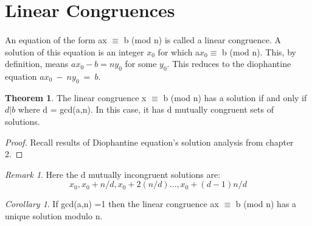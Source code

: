 \documentclass[15,a4paper]{report}
\theoremstyle{definition}
\newtheorem{theorem}{Theorem}[section]
\theoremstyle{remark}
\newtheorem*{remark}{Remark}
\newtheorem{corollary}{Corollary}[theorem]
\begin{document}
    \section{Linear Congruences}
        \paragraph{} An equation of the form ax $\equiv$ b (mod n) is called a linear congruence. A solution of this equation is an integer $x_0$ for which a$x_0 \equiv$ b (mod n). This, by definition, means $a x_0 - b = n y _0$ for some $y_0$. This reduces to the diophantine equation $ a x_0~ -~ n y_0 ~=~ b$.
        \begin{theorem}
            The linear congruence x $\equiv$ b (mod n) has a solution if and only if $d|b$ where d = gcd(a,n). In this case, it has d mutually congruent sets of solutions.
        \end{theorem}
            \begin{proof}
                Recall results of Diophantine equation's solution analysis from chapter 2.
            \end{proof}
            \begin{remark}
                Here the d mutually incongruent solutions are: \[ x_0, x_0 + n/d , x_0 + 2(n/d) \dots , x_0 + (d-1)n/d \]
            \end{remark}
            \begin{corollary}
                If gcd(a,n) =1 then the linear congruence ax $\equiv$ b (mod n) has a unique solution modulo n.
            \end{corollary}
            
\end{document}
